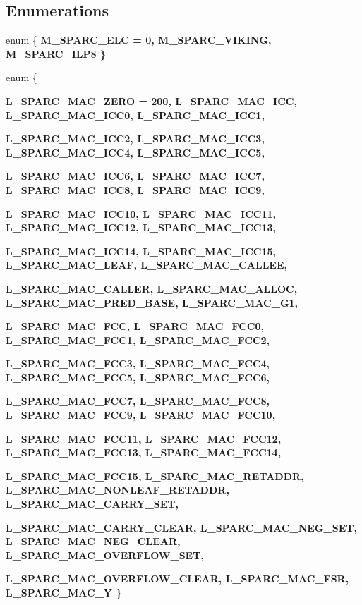 \subsection*{Enumerations}
\begin{CompactItemize}
\item 
enum \{ \bf{M\_\-SPARC\_\-ELC} =  0, 
\bf{M\_\-SPARC\_\-VIKING}, 
\bf{M\_\-SPARC\_\-ILP8}
 \}
\item 
enum \{ \par
\bf{L\_\-SPARC\_\-MAC\_\-ZERO} =  200, 
\bf{L\_\-SPARC\_\-MAC\_\-ICC}, 
\bf{L\_\-SPARC\_\-MAC\_\-ICC0}, 
\bf{L\_\-SPARC\_\-MAC\_\-ICC1}, 
\par
\bf{L\_\-SPARC\_\-MAC\_\-ICC2}, 
\bf{L\_\-SPARC\_\-MAC\_\-ICC3}, 
\bf{L\_\-SPARC\_\-MAC\_\-ICC4}, 
\bf{L\_\-SPARC\_\-MAC\_\-ICC5}, 
\par
\bf{L\_\-SPARC\_\-MAC\_\-ICC6}, 
\bf{L\_\-SPARC\_\-MAC\_\-ICC7}, 
\bf{L\_\-SPARC\_\-MAC\_\-ICC8}, 
\bf{L\_\-SPARC\_\-MAC\_\-ICC9}, 
\par
\bf{L\_\-SPARC\_\-MAC\_\-ICC10}, 
\bf{L\_\-SPARC\_\-MAC\_\-ICC11}, 
\bf{L\_\-SPARC\_\-MAC\_\-ICC12}, 
\bf{L\_\-SPARC\_\-MAC\_\-ICC13}, 
\par
\bf{L\_\-SPARC\_\-MAC\_\-ICC14}, 
\bf{L\_\-SPARC\_\-MAC\_\-ICC15}, 
\bf{L\_\-SPARC\_\-MAC\_\-LEAF}, 
\bf{L\_\-SPARC\_\-MAC\_\-CALLEE}, 
\par
\bf{L\_\-SPARC\_\-MAC\_\-CALLER}, 
\bf{L\_\-SPARC\_\-MAC\_\-ALLOC}, 
\bf{L\_\-SPARC\_\-MAC\_\-PRED\_\-BASE}, 
\bf{L\_\-SPARC\_\-MAC\_\-G1}, 
\par
\bf{L\_\-SPARC\_\-MAC\_\-FCC}, 
\bf{L\_\-SPARC\_\-MAC\_\-FCC0}, 
\bf{L\_\-SPARC\_\-MAC\_\-FCC1}, 
\bf{L\_\-SPARC\_\-MAC\_\-FCC2}, 
\par
\bf{L\_\-SPARC\_\-MAC\_\-FCC3}, 
\bf{L\_\-SPARC\_\-MAC\_\-FCC4}, 
\bf{L\_\-SPARC\_\-MAC\_\-FCC5}, 
\bf{L\_\-SPARC\_\-MAC\_\-FCC6}, 
\par
\bf{L\_\-SPARC\_\-MAC\_\-FCC7}, 
\bf{L\_\-SPARC\_\-MAC\_\-FCC8}, 
\bf{L\_\-SPARC\_\-MAC\_\-FCC9}, 
\bf{L\_\-SPARC\_\-MAC\_\-FCC10}, 
\par
\bf{L\_\-SPARC\_\-MAC\_\-FCC11}, 
\bf{L\_\-SPARC\_\-MAC\_\-FCC12}, 
\bf{L\_\-SPARC\_\-MAC\_\-FCC13}, 
\bf{L\_\-SPARC\_\-MAC\_\-FCC14}, 
\par
\bf{L\_\-SPARC\_\-MAC\_\-FCC15}, 
\bf{L\_\-SPARC\_\-MAC\_\-RETADDR}, 
\bf{L\_\-SPARC\_\-MAC\_\-NONLEAF\_\-RETADDR}, 
\bf{L\_\-SPARC\_\-MAC\_\-CARRY\_\-SET}, 
\par
\bf{L\_\-SPARC\_\-MAC\_\-CARRY\_\-CLEAR}, 
\bf{L\_\-SPARC\_\-MAC\_\-NEG\_\-SET}, 
\bf{L\_\-SPARC\_\-MAC\_\-NEG\_\-CLEAR}, 
\bf{L\_\-SPARC\_\-MAC\_\-OVERFLOW\_\-SET}, 
\par
\bf{L\_\-SPARC\_\-MAC\_\-OVERFLOW\_\-CLEAR}, 
\bf{L\_\-SPARC\_\-MAC\_\-FSR}, 
\bf{L\_\-SPARC\_\-MAC\_\-Y}
 \}
\end{CompactItemize}
